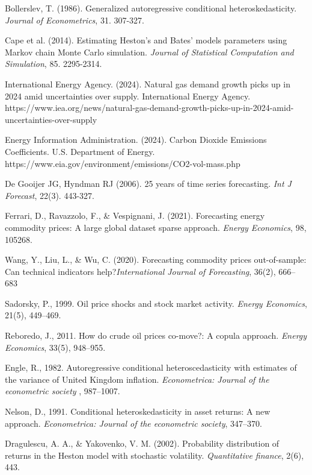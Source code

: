\documentclass[12pt,a4paper]{article}
\numberwithin{equation}{section}
\begin{document}
\newpage
\begin{thebibliography}{11}
\bibitem{}
Bollerslev, T. (1986). Generalized autoregressive conditional heteroskedasticity.  \emph{Journal of Econometrics}, 31. 307-327.

\bibitem{}
Cape et al. (2014). Estimating Heston's and Bates’ models parameters using Markov chain Monte Carlo simulation.  \emph{Journal of Statistical Computation and Simulation}, 85. 2295-2314.

\bibitem{}
International Energy Agency. (2024). Natural gas demand growth picks up in 2024 amid uncertainties over supply. International Energy Agency. https://www.iea.org/news/natural-gas-demand-growth-picks-up-in-2024-amid-uncertainties-over-supply

\bibitem{}
Energy Information Administration. (2024). Carbon Dioxide Emissions Coefficients. U.S. Department of Energy. https://www.eia.gov/environment/emissions/CO2-vol-mass.php


\bibitem{}

De Gooijer JG, Hyndman RJ (2006). 25 years of time series forecasting. \emph{Int J Forecast}, 22(3). 443-327.


\bibitem{}
Ferrari, D., Ravazzolo, F., \& Vespignani, J. (2021). Forecasting energy commodity prices: A large global dataset sparse approach. \emph{Energy Economics}, 98, 105268.


\bibitem{}
Wang, Y., Liu, L., \& Wu, C. (2020). Forecasting commodity prices out-of-sample: Can technical indicators help?\emph{International Journal of Forecasting}, 36(2), 666–683

\bibitem{}
Sadorsky, P., 1999. Oil price shocks and stock market activity. \emph{Energy Economics}, 21(5), 449–469.

\bibitem{}
Reboredo, J., 2011. How do crude oil prices co-move?: A copula approach. \emph{Energy Economics}, 33(5), 948–955.

\bibitem{}
Engle, R., 1982. Autoregressive conditional heteroscedasticity with estimates of the variance of United Kingdom inflation. \emph{Econometrica: Journal of the econometric society} , 987–1007.

\bibitem{}
Nelson, D., 1991. Conditional heteroskedasticity in asset returns: A new approach. \emph{Econometrica: Journal of the econometric society}, 347–370.

\bibitem{}
Dragulescu, A. A., \& Yakovenko, V. M. (2002). Probability distribution of returns in the Heston model with stochastic volatility. \emph{Quantitative finance}, 2(6), 443.


\end{thebibliography}
\end{document}
